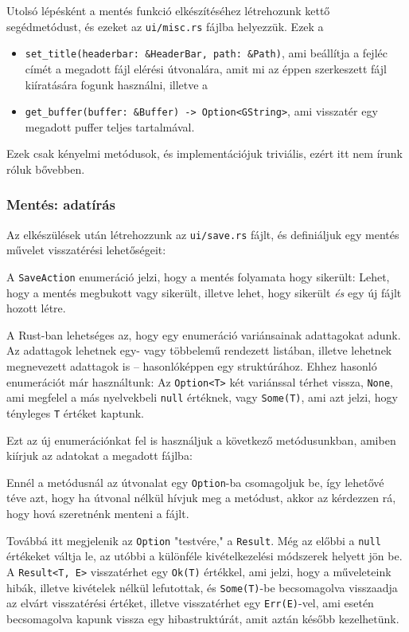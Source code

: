 Utolsó lépésként a mentés funkció elkészítéséhez létrehozunk kettő segédmetódust,
és ezeket az \texttt{ui/misc.rs} fájlba helyezzük.
Ezek a 
\begin{itemize}
    \item \verb+set_title(headerbar: &HeaderBar, path: &Path)+,
    ami beállítja a fejléc címét a megadott fájl elérési útvonalára,
    amit mi az éppen szerkeszett fájl kiíratására fogunk használni, illetve a
    \item \verb+get_buffer(buffer: &Buffer) -> Option<GString>+,
    ami visszatér egy megadott puffer teljes tartalmával.
\end{itemize}
Ezek csak kényelmi metódusok, és implementációjuk triviális, ezért itt nem írunk róluk bővebben.

\subsubsection{Mentés: adatírás}

Az elkészülések után létrehozzunk az \texttt{ui/save.rs} fájlt,
és definiáljuk egy mentés művelet visszatérési lehetőségeit:



A \texttt{SaveAction} enumeráció jelzi, hogy a mentés folyamata hogy sikerült:
Lehet, hogy a mentés megbukott vagy sikerült, illetve lehet, hogy sikerült \textit{és}
egy új fájlt hozott létre.

A Rust-ban lehetséges az, hogy egy enumeráció variánsainak adattagokat adunk.
Az adattagok lehetnek egy- vagy többelemű rendezett listában, illetve lehetnek
megnevezett adattagok is -- hasonlóképpen egy struktúrához.
Ehhez hasonló enumerációt már használtunk: Az \texttt{Option<T>} két variánssal térhet vissza,
\texttt{None}, ami megfelel a más nyelvekbeli \texttt{null} értéknek, vagy
\texttt{Some(T)}, ami azt jelzi, hogy tényleges \texttt{T} értéket kaptunk.

Ezt az új enumerációnkat fel is használjuk a következő metódusunkban, amiben
kiírjuk az adatokat a megadott fájlba:



Ennél a metódusnál az útvonalat egy \texttt{Option}-ba csomagoljuk be, így lehetővé téve
azt, hogy ha útvonal nélkül hívjuk meg a metódust, akkor az kérdezzen rá, hogy hová
szeretnénk menteni a fájlt.

Továbbá itt megjelenik az \texttt{Option} "testvére," a \texttt{Result}.
Még az előbbi a \texttt{null} értékeket váltja le, az utóbbi a különféle kivételkezelési
módszerek helyett jön be.
A \texttt{Result<T, E>} visszatérhet egy \texttt{Ok(T)} értékkel, ami jelzi,
hogy a műveleteink hibák, illetve kivételek nélkül lefutottak, és \texttt{Some(T)}-be 
becsomagolva visszaadja az elvárt visszatérési értéket,
illetve visszatérhet egy \texttt{Err(E)}-vel, ami esetén becsomagolva kapunk vissza
egy hibastruktúrát, amit aztán később kezelhetünk.

